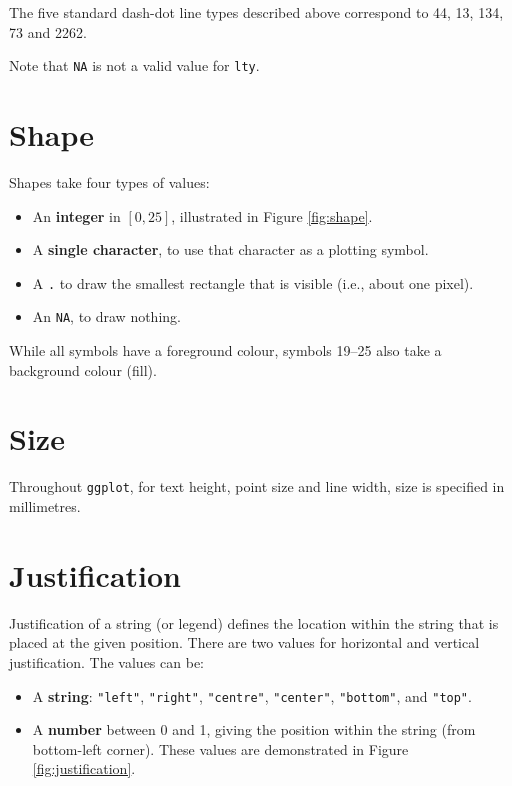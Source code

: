 The five standard dash-dot line types described above correspond to 44,
13, 134, 73 and 2262.

Note that \texttt{NA} is not a valid value for \texttt{lty}.

\section{Shape}\label{sec:shape-spec}

Shapes take four types of values: 

\begin{itemize}
\itemsep1pt\parskip0pt
\item
  An \textbf{integer} in \([0, 25]\), illustrated in Figure
  \ref{fig:shape}.
\item
  A \textbf{single character}, to use that character as a plotting
  symbol.\\
\item
  A \texttt{.} to draw the smallest rectangle that is visible (i.e.,
  about one pixel).
\item
  An \texttt{NA}, to draw nothing.
\end{itemize}

While all symbols have a foreground colour, symbols 19--25 also take a
background colour (fill).

\section{Size}\label{sec:size}

Throughout \texttt{ggplot}, for text height, point size and line width,
size is specified in millimetres. 

\section{Justification}\label{sec:justification-spec}

Justification of a string (or legend) defines the location within the
string that is placed at the given position. There are two values for
horizontal and vertical justification. The values can be:
  

\begin{itemize}
\itemsep1pt\parskip0pt
\item
  A \textbf{string}: \texttt{"left"}, \texttt{"right"},
  \texttt{"centre"}, \texttt{"center"}, \texttt{"bottom"}, and
  \texttt{"top"}.
\item
  A \textbf{number} between 0 and 1, giving the position within the
  string (from bottom-left corner). These values are demonstrated in
  Figure \ref{fig:justification}.
\end{itemize}

